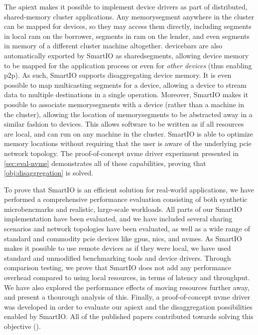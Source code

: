 The \gls{apiext} makes it possible to implement device drivers as part of distributed, shared-memory cluster applications. 
%
Any \gls{memorysegment} anywhere in the cluster can be mapped for devices, so they may access them directly, including \glspl{segment} in local \gls{ram} on the \gls{borrower}, \glspl{segment} in \gls{ram} on the \gls{lender}, and even \glspl{segment} in memory of a different cluster machine altogether.
%
\Glspl{devicebar} are also automatically exported by SmartIO as \glspl{sharedsegment}, allowing device memory to be mapped for the application process or even for \emph{other devices} (thus enabling \gls{p2p}).
%
As such, SmartIO supports \gls{disaggregating} device memory.
%
It is even possible to map \gls{multicasting} \glspl{segment} for a device, allowing a device to stream data to multiple destinations in a single operation.
%
Moreover, SmartIO makes it possible to associate \glspl{memorysegment} with a device (rather than a machine in the cluster), allowing the location of \glspl{memorysegment} to be abstracted away in a similar fashion to devices.
%
This allows software to be written as if all resources are local, and can run on any machine in the cluster.
%
%
SmartIO is able to optimize memory locations without requiring that the user is aware of the underlying \gls{pcie} network topology.
%
The proof-of-concept \gls{nvme} driver experiment presented in \cref{sec:eval-nvme} demonstrates all of these capabilities, proving that \cref*{obj:disaggregation} is solved.



\objexperiments*%
%
To prove that SmartIO is an efficient solution for real-world applications, we have performed a comprehensive performance evaluation consisting of both synthetic microbencmarks and realistic, large-scale workloads.
%
All parts of our SmartIO implementation have been evaluated, and we have included several sharing scenarios and network topologies have been evaluated, as well as a wide range of standard and commodity \gls{pcie} devices like \glspl{gpu}, \glspl{nic}, and \glspl{nvme}.
%
As SmartIO makes it possible to use remote devices as if they were local, we have used standard and unmodified benchmarking tools and device drivers.
%
Through comparison testing, we prove that SmartIO does not add any performance overhead compared to using local resources, in terms of latency and throughput.
%
We have also explored the performance effects of moving resources further away, and present a thourough analysis of this.
%
Finally, a proof-of-concept \gls{nvme} driver was developed in order to evaluate our \gls{apiext} and the \gls{disaggregation} possibilities enabled by SmartIO.
%
All of the published papers contributed towards solving this objective ().




